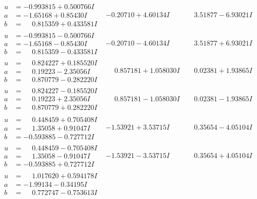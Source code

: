 \documentclass[1p]{elsarticle_modified}
\theoremstyle{definition}
\begin{document}
$$\begin{array}{c|c|c}
\begin{aligned}
u &= -0.993815 + 0.500766 I \\
a &= -1.65168 + 0.85430 I \\
b &= \phantom{-}0.815359 + 0.433581 I\end{aligned}
 & -0.20710 + 4.60134 I & \phantom{-}3.51877 - 6.93021 I \\ \hline\begin{aligned}
u &= -0.993815 - 0.500766 I \\
a &= -1.65168 - 0.85430 I \\
b &= \phantom{-}0.815359 - 0.433581 I\end{aligned}
 & -0.20710 - 4.60134 I & \phantom{-}3.51877 + 6.93021 I \\ \hline\begin{aligned}
u &= \phantom{-}0.824227 + 0.185520 I \\
a &= \phantom{-}0.19223 - 2.35056 I \\
b &= \phantom{-}0.870779 - 0.282220 I\end{aligned}
 & \phantom{-}0.857181 + 1.058030 I & \phantom{-}0.02381 + 1.93865 I \\ \hline\begin{aligned}
u &= \phantom{-}0.824227 - 0.185520 I \\
a &= \phantom{-}0.19223 + 2.35056 I \\
b &= \phantom{-}0.870779 + 0.282220 I\end{aligned}
 & \phantom{-}0.857181 - 1.058030 I & \phantom{-}0.02381 - 1.93865 I \\ \hline\begin{aligned}
u &= \phantom{-}0.448459 + 0.705408 I \\
a &= \phantom{-}1.35058 + 0.91047 I \\
b &= -0.593885 - 0.727712 I\end{aligned}
 & -1.53921 + 3.53715 I & \phantom{-}0.35654 - 4.05104 I \\ \hline\begin{aligned}
u &= \phantom{-}0.448459 - 0.705408 I \\
a &= \phantom{-}1.35058 - 0.91047 I \\
b &= -0.593885 + 0.727712 I\end{aligned}
 & -1.53921 - 3.53715 I & \phantom{-}0.35654 + 4.05104 I \\ \hline\begin{aligned}
u &= \phantom{-}1.017620 + 0.594178 I \\
a &= -1.99134 - 0.34195 I \\
b &= \phantom{-}0.772747 - 0.753613 I\end{aligned}

\end{array}$$
\end{document}
